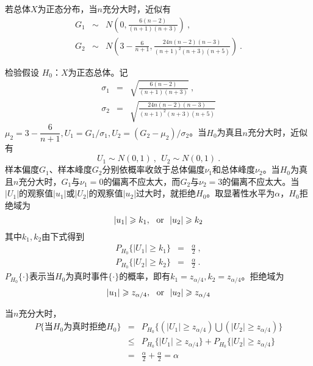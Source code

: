 \documentclass[12pt,a4paper]{article}
\begin{document}
若总体$X$为正态分布，当$n$充分大时，近似有
\begin{eqnarray}
G_1 &\sim& N\left(0, \frac{6(n-2)}{(n+1)(n+3)} \right) ~, \\
G_2 &\sim& N\left(3-\frac{6}{n+1},  \frac{24n(n-2)(n-3)}{(n+1)^2(n+3)(n+5)} \right) ~.
\end{eqnarray}

检验假设 $H_0$：$X$为正态总体。记
\begin{eqnarray}
\sigma_1 &=& \sqrt{\frac{6(n-2)}{(n+1)(n+3)} }~, \\
\sigma_2 &=& \sqrt{\frac{24n(n-2)(n-3)}{(n+1)^2(n+3)(n+5)} }
\end{eqnarray}
$\mu_2 = 3-\dfrac{6}{n+1}, U_1 = G_1/\sigma_1, U_2 = (G_2-\mu_2)/\sigma_2$。当$H_0$为真且$n$充分大时，近似有
\begin{equation}
U_1 \sim N(0, 1) ~, ~~ U_2 \sim N(0, 1) ~.
\end{equation}
样本偏度$G_1$、样本峰度$G_2$分别依概率收敛于总体偏度$\nu_1$和总体峰度$\nu_2$。当$H_0$为真且$n$充分大时，$G_1$与$\nu_1 = 0$的偏离不应太大，而$G_2$与$\nu_2 = 3$的偏离不应太大。当$|U_1|$的观察值$|u_1|$或$|U_2|$的观察值$|u_2|$过大时，就拒绝$H_0$。取显著性水平为$\alpha$，$H_0$拒绝域为
\begin{equation}
|u_1| \geqslant k_1, ~~ {\rm or} ~~  |u_2| \geqslant k_2
\end{equation}
其中$k_1, k_2$由下式得到
\begin{eqnarray}
P_{H_0}\{ |U_1| \geqslant k_1 \} &=& \frac{\alpha}{2} ~, \\
P_{H_0}\{ |U_2| \geqslant k_2 \} &=& \frac{\alpha}{2} ~.
\end{eqnarray}
$P_{H_0}\{\cdot \}$表示当$H_0$为真时事件$\{\cdot \}$的概率，即有$k_1 = z_{\alpha/4}, k_2 = z_{\alpha/4}$。拒绝域为
\begin{equation}
|u_1| \geqslant z_{\alpha/4}, ~~ {\rm or} ~~  |u_2| \geqslant z_{\alpha/4}
\end{equation}

当$n$充分大时，
\begin{eqnarray}
\nonumber P\{\text{当}H_0\text{为真时拒绝}H_0\} &=& P_{H_0}\{ (|U_1| \geqslant z_{\alpha/4}) \bigcup (|U_2| \geqslant z_{\alpha/4}) \}  \\
\nonumber &\leqslant& P_{H_0}\{|U_1| \geqslant z_{\alpha/4} \} + P_{H_0}\{|U_2| \geqslant z_{\alpha/4} \} \\
&=& \frac{\alpha}{2} + \frac{\alpha}{2} = \alpha
\end{eqnarray}
\end{document}
